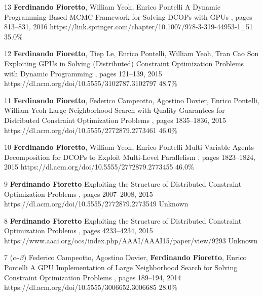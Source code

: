 \begin{pubs}
\confentry
		{13} %
		{{\bf Ferdinando Fioretto}, William Yeoh, Enrico Pontelli}
		{A Dynamic Programming-Based MCMC Framework for Solving DCOPs with GPUs}
		{\procCP, pages 813--831,	2016}
		{https://link.springer.com/chapter/10.1007/978-3-319-44953-1\_51}
		{35.0\%}%

\confentry
		{12} %
		{{\bf Ferdinando Fioretto}, Tiep Le, Enrico Pontelli, William Yeoh, Tran Cao Son}
		{Exploiting GPUs in Solving (Distributed) Constraint Optimization Problems with Dynamic Programming}
		{\procCP, pages 121--139, 2015}
		{https://dl.acm.org/doi/10.5555/3102787.3102797}
		{48.7\%}%

\confentry
		{11} %
		{{\bf Ferdinando Fioretto}, Federico Campeotto, Agostino Dovier, Enrico Pontelli, William Yeoh}
		{Large Neighborhood Search with Quality Guarantees for Distributed Constraint Optimization Problems}
		{\procAAMAS, pages 1835--1836, 2015}
		{https://dl.acm.org/doi/10.5555/2772879.2773461}
		{46.0\%}

\confentry
		{10} %
		{{\bf Ferdinando Fioretto}, William Yeoh, Enrico Pontelli}
		{Multi-Variable Agents Decomposition for DCOPs to Exploit Multi-Level Parallelism}
		{\procAAMAS, pages 1823--1824, 2015}
		{https://dl.acm.org/doi/10.5555/2772879.2773455}
		{46.0\%}

\confentry
		{9} %
		{{\bf Ferdinando Fioretto}}
		{Exploiting the Structure of Distributed Constraint Optimization Problems} 
		{\procAAMAS, pages 2007--2008, 2015}
		{https://dl.acm.org/doi/10.5555/2772879.2773549}
		{Unknown}

\confentry
		{8} %
		{{\bf Ferdinando Fioretto}} 
		{Exploiting the Structure of Distributed Constraint Optimization Problems}
		{\procAAAI,  pages 4233--4234, 2015}
		{https://www.aaai.org/ocs/index.php/AAAI/AAAI15/paper/view/9293}
		{Unknown}

	\confentry 
		{7} %
		{($\alpha$-$\beta$) 
		Federico Campeotto, Agostino Dovier, {\bf Ferdinando Fioretto}, Enrico Pontelli}
		{A GPU Implementation of Large Neighborhood Search for Solving Constraint Optimization Problems} 
		{\procECAI, pages 189--194, 2014}
		{https://dl.acm.org/doi/10.5555/3006652.3006685}
		{28.0\%}


\end{pubs}
